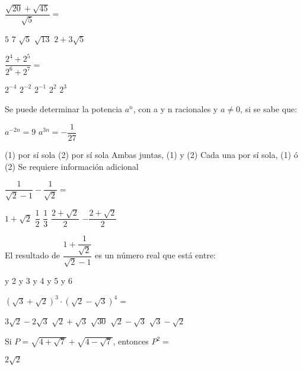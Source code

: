 \documentclass[pagina vacia]{srs}
\begin{document}
\begin{preguntas}
\pregunta \(\dfrac{\sqrt{20} + \sqrt{45}}{\sqrt{5}} =\)
\begin{vertical}
\alternativa \(5\)
\alternativa \(7\)
\alternativa \(\sqrt{5}\)
\alternativa \(\sqrt{13}\)
\alternativa \(2 + 3\sqrt{5}\)
\end{vertical}

\pregunta \(\dfrac{2^4 + 2^5}{2^6 + 2^7} =\)
\begin{vertical}
\alternativa \(2^{-4}\)
\alternativa \(2^{-2}\)
\alternativa \(2^{-1}\)
\alternativa \(2^2\)
\alternativa \(2^3\)
\end{vertical}

\pregunta Se puede determinar la potencia \(a^n\), con a y n racionales y \(a \neq 0\), si se sabe que:
\begin{verticaln}
\alternativa \(a^{-2n} = 9\)
\alternativa \(a^{3n} = -\dfrac{1}{27}\)
\end{verticaln}
\begin{vertical}
\alternativa (1) por sí sola
\alternativa (2) por sí sola
\alternativa Ambas juntas, (1) y (2)
\alternativa Cada una por sí sola, (1) ó (2)
\alternativa Se requiere información adicional
\end{vertical}

\pregunta \(\dfrac{1}{\sqrt{2}-1} - \dfrac{1}{\sqrt{2}} =\)
\begin{vertical}
\alternativa \(1 + \sqrt{2}\)
\alternativa \(\dfrac{1}{2}\)
\alternativa \(\dfrac{1}{3}\)
\alternativa \(\dfrac{2 + \sqrt{2}}{2}\)
\alternativa \(-\dfrac{2 + \sqrt{2}}{2}\)
\end{vertical}

\pregunta El resultado de \(\dfrac{1 + \dfrac{1}{\sqrt{2}}}{\sqrt{2}-1}\) es un número real que está entre:
\begin{vertical}
 y 2
 y 3
 y 4
 y 5
 y 6
\end{vertical}

\pregunta \((\sqrt{3}+\sqrt{2})^3 \cdot (\sqrt{2}-\sqrt{3})^4 =\)
\begin{vertical}
\alternativa \(3\sqrt{2}-2\sqrt{3}\)
\alternativa \(\sqrt{2}+\sqrt{3}\)
\alternativa \(\sqrt{30}\)
\alternativa \(\sqrt{2}-\sqrt{3}\)
\alternativa \(\sqrt{3}-\sqrt{2}\)
\end{vertical}

\pregunta Si \(P = \sqrt{4+\sqrt{7}} + \sqrt{4-\sqrt{7}}\), entonces \(P^2 =\)
\begin{vertical}
\alternativa \(2\sqrt{2}\)
\end{vertical}


\end{preguntas}
\end{document}
